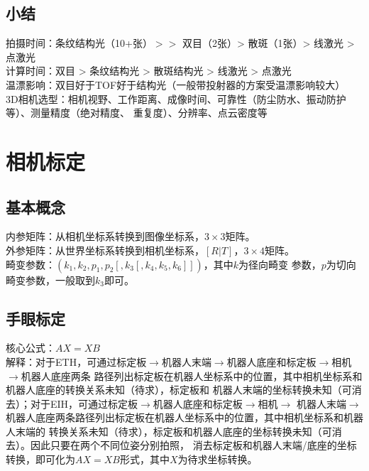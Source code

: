 \documentclass[11pt]{article}
\begin{document}
\subsection{小结}
拍摄时间：条纹结构光（10+张）$>>$ 双目（2张）> 散斑（1张）> 线激光 > 点激光  \\
计算时间：双目 > 条纹结构光 > 散斑结构光 > 线激光 > 点激光  \\
温漂影响：双目好于TOF好于结构光（一般带投射器的方案受温漂影响较大）  \\
3D相机选型：相机视野、工作距离、成像时间、可靠性（防尘防水、振动防护等）、测量精度（绝对精度、
重复度）、分辨率、点云密度等


\section{相机标定}

\subsection{基本概念}
内参矩阵：从相机坐标系转换到图像坐标系，$3 \times 3$矩阵。  \\
外参矩阵：从世界坐标系转换到相机坐标系，$[R|T]$，$3 \times 4$矩阵。  \\
畸变参数：$(k_{1},k_{2},p_{1},p_{2}[,k_{3}[,k_{4},k_{5},k_{6}]])$，其中$k$为径向畸变
参数，$p$为切向畸变参数，一般取到$k_{3}$即可。

\subsection{手眼标定}
核心公式：$AX=XB$  \\
解释：对于ETH，可通过标定板$\to$机器人末端$\to$机器人底座和标定板$\to$相机$\to$机器人底座两条
路径列出标定板在机器人坐标系中的位置，其中相机坐标系和机器人底座的转换关系未知（待求），标定板和
机器人末端的坐标转换未知（可消去）；对于EIH，可通过标定板$\to$机器人底座和标定板$\to$相机$\to$
机器人末端$\to$机器人底座两条路径列出标定板在机器人坐标系中的位置，其中相机坐标系和机器人末端的
转换关系未知（待求），标定板和机器人底座的坐标转换未知（可消去）。因此只要在两个不同位姿分别拍照，
消去标定板和机器人末端/底座的坐标转换，即可化为$AX=XB$形式，其中$X$为待求坐标转换。
\end{document}
